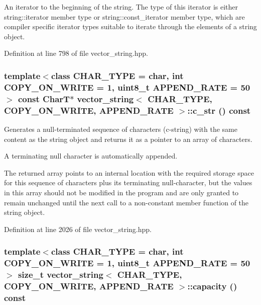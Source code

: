 An iterator to the beginning of the string. The type of this iterator is either string::iterator member type or string::const\_\-iterator member type, which are compiler specific iterator types suitable to iterate through the elements of a string object. 

Definition at line 798 of file vector\_\-string.hpp.\hypertarget{classvector__string_77c74227c7fe23929099157581a23fd3}{
\subsubsection[{c\_\-str}]{\setlength{\rightskip}{0pt plus 5cm}template$<$class CHAR\_\-TYPE  = char, int COPY\_\-ON\_\-WRITE = 1, uint8\_\-t APPEND\_\-RATE = 50$>$ const CharT$\ast$ {\bf vector\_\-string}$<$ CHAR\_\-TYPE, COPY\_\-ON\_\-WRITE, APPEND\_\-RATE $>$::c\_\-str () const}}
\label{classvector__string_77c74227c7fe23929099157581a23fd3}


Generates a null-terminated sequence of characters (c-string) with the same content as the string object and returns it as a pointer to an array of characters.

A terminating null character is automatically appended.

The returned array points to an internal location with the required storage space for this sequence of characters plus its terminating null-character, but the values in this array should not be modified in the program and are only granted to remain unchanged until the next call to a non-constant member function of the string object. 

Definition at line 2026 of file vector\_\-string.hpp.\hypertarget{classvector__string_0831bcf35fac1ef12692f7aade586f7b}{
\subsubsection[{capacity}]{\setlength{\rightskip}{0pt plus 5cm}template$<$class CHAR\_\-TYPE  = char, int COPY\_\-ON\_\-WRITE = 1, uint8\_\-t APPEND\_\-RATE = 50$>$ size\_\-t {\bf vector\_\-string}$<$ CHAR\_\-TYPE, COPY\_\-ON\_\-WRITE, APPEND\_\-RATE $>$::capacity () const}}
\label{classvector__string_0831bcf35fac1ef12692f7aade586f7b}


